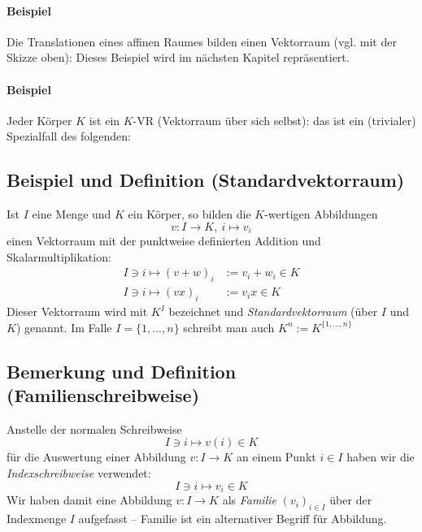  	\paragraph{Beispiel}
 		Die Translationen eines affinen Raumes bilden einen Vektorraum (vgl. mit der Skizze oben): Dieses Beispiel wird im nächsten Kapitel repräsentiert.

 	\paragraph{Beispiel}
 		Jeder Körper $ K $ ist ein $ K $-VR (Vektorraum über sich selbst): das ist ein (trivialer) Spezialfall des folgenden:

 \subsection{Beispiel und Definition (Standardvektorraum)}
 	\begin{Definition}[Standardvektorraum]
 		Ist $ I $ eine Menge und $ K $ ein Körper, so bilden die $ K $-wertigen Abbildungen
 		\[
 			v: I \to K,\ i \mapsto v_i
 		\]
 		einen Vektorraum mit der punktweise definierten Addition und Skalarmultiplikation:
 		\begin{align*}
 			I\ni i \mapsto (v+w)_i & := v_i+w_i\in K \\
 			I\ni i \mapsto (vx)_i  & := v_ix \in K
 		\end{align*}
 		Dieser Vektorraum wird mit $K^{I}$ bezeichnet und \emph{Standardvektorraum} (über $I$ und $K$) genannt. Im Falle $ I=\{1,...,n\} $ schreibt man auch $K^{n} := K^{\{1,...,n\}}$
 	\end{Definition}

 \subsection{Bemerkung und Definition (Familienschreibweise)}
 	\begin{Definition}
 		Anstelle der normalen Schreibweise
 		\[
 			I\ni i \mapsto v(i) \in K
 		\]
 		für die Auswertung einer Abbildung  $v: I \to K$ an einem Punkt $i\in I$ haben wir die \emph{Indexschreibweise} verwendet:
 		\[
 			I\ni i \mapsto v_i \in K
 		\]
 		Wir haben damit eine Abbildung $v: I \to K$ als \emph{Familie} $ (v_i)_{i\in I} $ über der Indexmenge $ I $ aufgefasst -- Familie ist ein \glqq alternativer\grqq{} Begriff für Abbildung.
 	\end{Definition}

